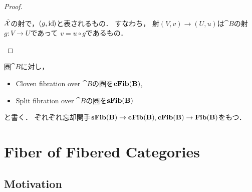 \begin{proof}
\begin{description}[labelindent=1cm]
            \item[Arrows.]
                $\tilde{\mathcal{X}}$の射で，$(g, \mathrm{id}_{\!})$と表されるもの．
                すなわち，
                射$(V, v) \to (U, u)$は$\cat{B}$の射$g \colon V \to U$であって
                $v=u \circ g$であるもの．
                \begin{center}
                \end{center}
        \end{description}
    \end{proof}

    \begin{Def}
        圏$\cat{B}$に対し，
        \begin{itemize}
            \item Cloven fibration over $\cat{B}$の圏を$\mathbf{cFib}(\mathbf{B})$,
            \item Split fibration over $\cat{B}$の圏を$\mathbf{sFib}(\mathbf{B})$
        \end{itemize}
        と書く．
        ぞれぞれ忘却関手$\mathbf{sFib}(\mathbf{B}) \to \mathbf{cFib}(\mathbf{B}), \mathbf{cFib}(\mathbf{B}) \to \mathbf{Fib}(\mathbf{B})$をもつ．
    \end{Def}

\section{Fiber of Fibered Categories}
\subsection{Motivation}

